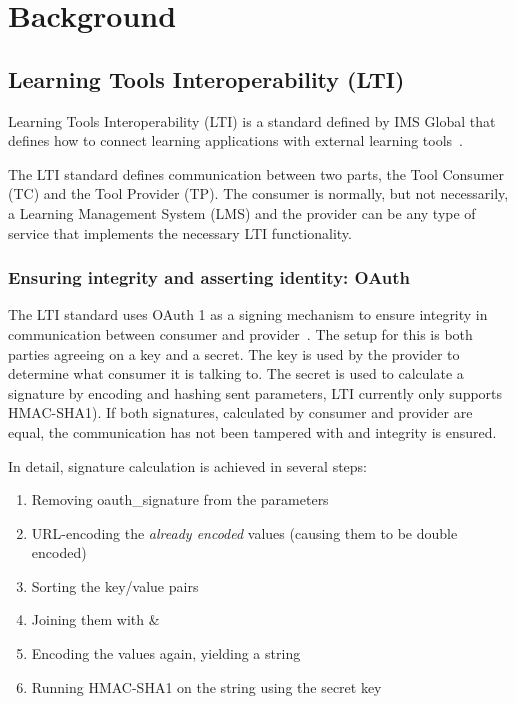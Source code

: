 \chapter{Background}

\section{Learning Tools Interoperability (LTI)}
Learning Tools Interoperability (LTI) is a standard defined by IMS Global that defines how to connect learning applications with external learning tools~\cite{OleksandrA.2015LearningPlatforms}.

The LTI standard defines communication between two parts, the Tool Consumer (TC) and the Tool Provider (TP). The consumer is normally, but not necessarily, a Learning Management System (LMS) and the provider can be any type of service that implements the necessary LTI functionality.

\label{ensuring_integrity}
\subsection{Ensuring integrity and asserting identity: OAuth}
The LTI standard uses OAuth 1 as a signing mechanism to ensure integrity in communication between consumer and provider~\cite{2019IsRequest}. The setup for this is both parties agreeing on a key and a secret. The key is used by the provider to determine what consumer it is talking to. The secret is used to calculate a signature by encoding and hashing sent parameters, LTI currently only supports HMAC-SHA1). If both signatures, calculated by consumer and provider are equal, the communication has not been tampered with and integrity is ensured.

In detail, signature calculation is achieved in several steps:
\begin{enumerate}[itemsep=0pt,topsep=0pt]
    \item Removing oauth\_signature from the parameters
    \item URL-encoding the \textit{already encoded} values (causing them to be double encoded)
    \item Sorting the key/value pairs
    \item Joining them with \&
    \item Encoding the values again, yielding a string
    \item Running HMAC-SHA1 on the string using the secret key
\end{enumerate}

